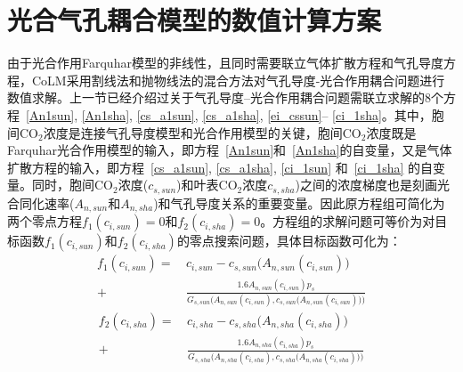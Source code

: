 \section{光合气孔耦合模型的数值计算方案}\label{光合气孔耦合模型的数值计算方案}
由于光合作用Farquhar模型的非线性，且同时需要联立气体扩散方程和气孔导度方程，CoLM采用割线法和抛物线法的混合方法对气孔导度-光合作用耦合问题进行数值求解。上一节已经介绍过关于气孔导度--光合作用耦合问题需联立求解的8个方程~\eqref{An1sun}, \eqref{An1sha}, \eqref{cs_a1sun}, \eqref{cs_a1sha}, \eqref{ei_cssun}--%
\eqref{ci_1sha}。其中，胞间$\mathrm{CO_2}$浓度是连接气孔导度模型和光合作用模型的关键，胞间$\mathrm{CO_2}$浓度既是Farquhar光合作用模型的输入，即方程~\eqref{An1sun}和~\eqref{An1sha}的自变量，又是气体扩散方程的输入，即方程~\eqref{cs_a1sun}, \eqref{cs_a1sha}, \eqref{ci_1sun} 和~\eqref{ci_1sha} 的自变量。同时，胞间$\mathrm{CO_2}$浓度($c_{s,sun}$)和叶表$\mathrm{CO_2}$浓度$c_{s,sha}$)之间的浓度梯度也是刻画光合同化速率($A_{n,sun}$和$A_{n,sha}$)和气孔导度关系的重要变量。因此原方程组可简化为两个零点方程$f_1(c_{i,sun})=0$和$f_2(c_{i,sha})=0$。方程组的求解问题可等价为对目标函数$f_1(c_{i,sun})$和$f_2(c_{i,sha})$的零点搜索问题，具体目标函数可化为：
\begin{align}\label{f1_cisun}
f_{1}\left(c_{i,sun}\right)=&\,c_{i,sun}-c_{s,sun}\big(A_{n,sun}\left(c_{i,sun}\right)\big) \nonumber \\[1ex] 
+& \, \frac{1.6A_{n,sun}\left(c_{i,sun}\right)p_s}{G_{s,sun}\Big(A_{n,sun}\left(c_{i,sun}\right),c_{s,sun}\big(A_{n,sun}\left(c_{i,sun}\right)\big)\Big)}
\end{align}
\begin{align}\label{f1_cisha}
f_{2}\left(c_{i,sha}\right)=&\,c_{i,sha}-c_{s,sha}\big(A_{n,sha}\left(c_{i,sha}\right)\big) \nonumber \\[1ex] 
+& \, \frac{1.6A_{n,sha}\left(c_{i,sha}\right)p_s}{G_{s,sha}\Big(A_{n,sha}\left(c_{i,sha}\right),c_{s,sha}\big(A_{n,sha}\left(c_{i,sha}\right)\big)\Big)}
\end{align}

